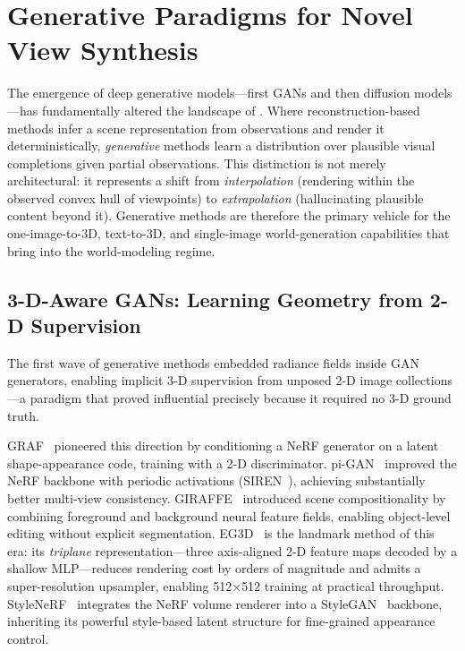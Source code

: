 \section{Generative Paradigms for Novel View Synthesis}
\label{sec:generative}

The emergence of deep generative models---first GANs and then diffusion
models---has fundamentally altered the landscape of \nvs{}.
Where reconstruction-based methods infer a scene representation from observations
and render it deterministically, \emph{generative} methods learn a distribution
over plausible visual completions given partial observations.
This distinction is not merely architectural: it represents a shift from
\emph{interpolation} (rendering within the observed convex hull of viewpoints)
to \emph{extrapolation} (hallucinating plausible content beyond it).
Generative methods are therefore the primary vehicle for the one-image-to-3D,
text-to-3D, and single-image world-generation capabilities that bring \nvs{}
into the world-modeling regime.

\subsection{3-D-Aware GANs: Learning Geometry from 2-D Supervision}

The first wave of generative \nvs{} methods embedded radiance fields inside
GAN generators, enabling implicit 3-D supervision from unposed 2-D image
collections---a paradigm that proved influential precisely because it
required no 3-D ground truth.

GRAF~\citep{schwarz2020graf} pioneered this direction by conditioning a NeRF
generator on a latent shape-appearance code, training with a 2-D discriminator.
pi-GAN~\citep{chan2021pigan} improved the NeRF backbone with periodic activations
(SIREN~\citep{sitzmann2020siren}), achieving substantially better multi-view
consistency.
GIRAFFE~\citep{niemeyer2021giraffe} introduced scene compositionality by
combining foreground and background neural feature fields, enabling object-level
editing without explicit segmentation.
EG3D~\citep{chan2022efficient} is the landmark method of this era: its
\emph{triplane} representation---three axis-aligned 2-D feature maps decoded by
a shallow MLP---reduces rendering cost by orders of magnitude and admits a
super-resolution upsampler, enabling 512$\times$512 training at practical
throughput.
StyleNeRF~\citep{gu2022stylenerf} integrates the NeRF volume renderer into a
StyleGAN~\citep{karras2019stylegan2} backbone, inheriting its powerful
style-based latent structure for fine-grained appearance control.


